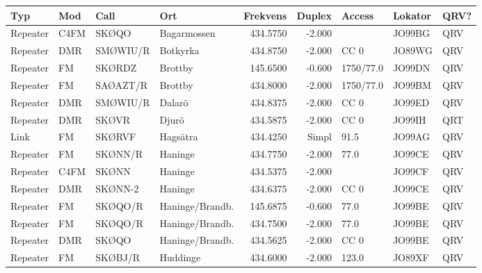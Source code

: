 {\begin{landscape}
\begin{longtable}{llllrrlll}
	\bf Typ           & \bf Mod            & \bf Call & \bf Ort         & \bf Frekvens & \bf Duplex & \bf Access & \bf Lokator & \bf QRV? \\ \hline
	\endhead
Repeater & C4FM               & SKØQO    & Bagarmossen     &     434.5750 &     -2.000 &            & JO99BG      & QRV      \\
	Repeater          & DMR                & SMØWIU/R & Botkyrka        &     434.8750 &     -2.000 & CC 0       & JO89WG      & QRV      \\
	Repeater          & FM                 & SKØRDZ   & Brottby         &     145.6500 &     -0.600 & 1750/77.0  & JO99DN      & QRV      \\
	Repeater          & FM                 & SAØAZT/R & Brottby         &     434.8000 &     -2.000 & 1750/77.0  & JO99BM      & QRV      \\
	Repeater          & DMR                & SMØWIU/R & Dalarö          &     434.8375 &     -2.000 & CC 0       & JO99ED      & QRV      \\
	Repeater          & DMR                & SKØVR    & Djurö           &     434.5875 &     -2.000 & CC 0       & JO99IH      & QRT      \\
	Link              & FM                 & SKØRVF   & Hagsätra        &     434.4250 &      Simpl & 91.5       & JO99AG      & QRV      \\
	Repeater          & FM                 & SKØNN/R  & Haninge         &     434.7750 &     -2.000 & 77.0       & JO99CE      & QRV      \\
	Repeater          & C4FM               & SKØNN    & Haninge         &     434.5375 &     -2.000 &            & JO99CF      & QRV      \\
	Repeater          & DMR                & SKØNN-2  & Haninge         &     434.6375 &     -2.000 & CC 0       & JO99CE      & QRV      \\
	Repeater          & FM                 & SKØQO/R  & Haninge/Brandb. &     145.6875 &     -0.600 & 77.0       & JO99BE      & QRV      \\
	Repeater          & FM                 & SKØQO/R  & Haninge/Brandb. &     434.7500 &     -2.000 & 77.0       & JO99BE      & QRV      \\
	Repeater          & DMR                & SKØQO    & Haninge/Brandb. &     434.5625 &     -2.000 & CC 0       & JO99BE      & QRV      \\
	Repeater          & FM                 & SKØBJ/R  & Huddinge        &     434.6000 &     -2.000 & 123.0      & JO89XF      & QRV      \\

\end{longtable}
\end{landscape}}
